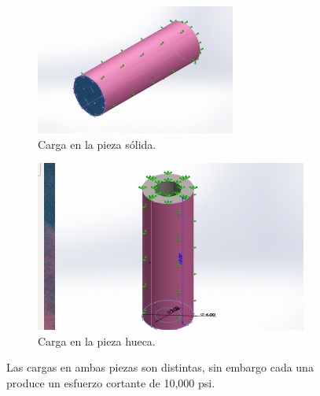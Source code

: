\documentclass[12pt, letterpaper]{article}
\begin{document}
\begin{figure}[H]
	\centering
	\begin{subfigure}[b]{0.49\linewidth}
		\includegraphics[width=\linewidth]{c1.png}
		\caption{Carga en la pieza sólida.}
	\end{subfigure}
	\begin{subfigure}[b]{0.49\linewidth}
		\includegraphics[width=\linewidth]{c2.png}
		\caption{Carga en la pieza hueca.}
	\end{subfigure}
	\caption{Las cargas en ambas piezas son distintas, sin embargo cada una produce un esfuerzo cortante de 10,000 psi.}
\end{figure}
\end{document}
